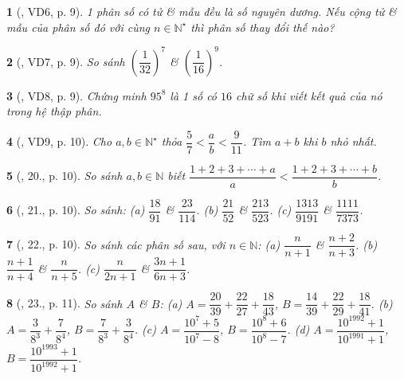 \documentclass{article}
\newtheorem{baitoan}{}
\begin{document}
\begin{baitoan}[\cite{Binh_Toan_6_tap_2}, VD6, p. 9]
	1 phân số có tử \& mẫu đều là số nguyên dương. Nếu cộng tử \& mẫu của phân số đó với cùng $n\in\mathbb{N}^\star$ thì phân số thay đổi thế nào?
\end{baitoan}

\begin{baitoan}[\cite{Binh_Toan_6_tap_2}, VD7, p. 9]
	So sánh $\left(\dfrac{1}{32}\right)^7$ \& $\left(\dfrac{1}{16}\right)^9$.
\end{baitoan}

\begin{baitoan}[\cite{Binh_Toan_6_tap_2}, VD8, p. 9]
	Chứng minh $95^8$ là 1 số có $16$ chữ số khi viết kết quả của nó trong hệ thập phân.
\end{baitoan}

\begin{baitoan}[\cite{Binh_Toan_6_tap_2}, VD9, p. 10]
	Cho $a,b\in\mathbb{N}^\star$ thỏa $\dfrac{5}{7} < \dfrac{a}{b} < \dfrac{9}{11}$. Tìm $a + b$ khi $b$ nhỏ nhất.
\end{baitoan}

\begin{baitoan}[\cite{Binh_Toan_6_tap_2}, 20., p. 10]
	So sánh $a,b\in\mathbb{N}$ biết $\dfrac{1 + 2 + 3 + \cdots + a}{a} < \dfrac{1 + 2 + 3 + \cdots + b}{b}$.
\end{baitoan}

\begin{baitoan}[\cite{Binh_Toan_6_tap_2}, 21., p. 10]
	So sánh: (a) $\dfrac{18}{91}$ \& $\dfrac{23}{114}$. (b) $\dfrac{21}{52}$ \& $\dfrac{213}{523}$. (c) $\dfrac{1313}{9191}$ \& $\dfrac{1111}{7373}$.
\end{baitoan}

\begin{baitoan}[\cite{Binh_Toan_6_tap_2}, 22., p. 10]
	So sánh các phân số sau, với $n\in\mathbb{N}$: (a) $\dfrac{n}{n + 1}$ \& $\dfrac{n + 2}{n + 3}$. (b) $\dfrac{n + 1}{n + 4}$ \& $\dfrac{n}{n + 5}$. (c) $\dfrac{n}{2n + 1}$ \& $\dfrac{3n + 1}{6n + 3}$.
\end{baitoan}

\begin{baitoan}[\cite{Binh_Toan_6_tap_2}, 23., p. 11]
	So sánh $A$ \& $B$: (a) $A = \dfrac{20}{39} + \dfrac{22}{27} + \dfrac{18}{43}$, $B = \dfrac{14}{39} + \dfrac{22}{29} + \dfrac{18}{41}$. (b) $A = \dfrac{3}{8^3} + \dfrac{7}{8^4}$, $B = \dfrac{7}{8^3} + \dfrac{3}{8^4}$. (c) $A = \dfrac{10^7 + 5}{10^7 - 8}$, $B = \dfrac{10^8 + 6}{10^8 - 7}$. (d) $A = \dfrac{10^{1992} + 1}{10^{1991} + 1}$, $B = \dfrac{10^{1993} + 1}{10^{1992} + 1}$.
\end{baitoan}
\end{document}
